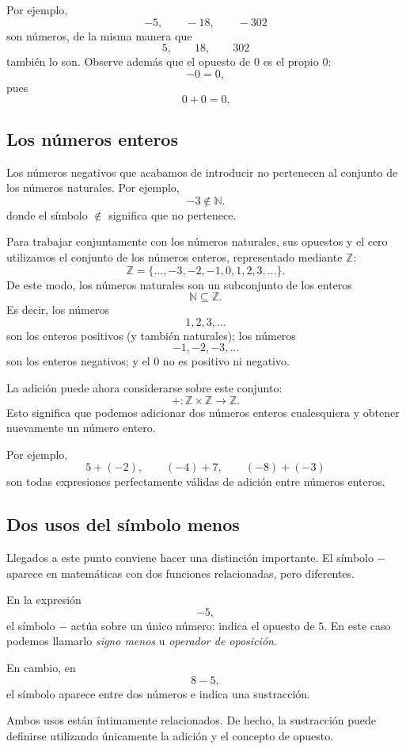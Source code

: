 Por ejemplo,
\[
-5,\qquad -18,\qquad -302
\]
son números, de la misma manera que
\[
5,\qquad18,\qquad302
\]
también lo son.
Observe además que el opuesto de \(0\) es el propio \(0\):
\[
-0=0,
\]
pues
\[
0+0=0.
\]

\subsection{Los números enteros}

Los números negativos que acabamos de introducir no pertenecen al conjunto de los números naturales. Por ejemplo,
\[
-3\notin\mathbb{N}.
\]
donde el símbolo \(\notin\) significa que no pertenece.

Para trabajar conjuntamente con los números naturales, sus opuestos y el cero utilizamos el conjunto de los números enteros, representado mediante \(\mathbb{Z}\):
\[
\mathbb{Z}
=
\{\ldots,-3,-2,-1,0,1,2,3,\ldots\}.
\]
De este modo, los números naturales son un subconjunto de los enteros
\[
\mathbb{N}\subseteq\mathbb{Z}.
\]
Es decir, los números
\[
1,2,3,\ldots
\]
son los enteros positivos (y también naturales); los números
\[
-1,-2,-3,\ldots
\]
son los enteros negativos; y el \(0\) no es positivo ni negativo.

La adición puede ahora considerarse sobre este conjunto:
\[
+\colon\mathbb{Z}\times\mathbb{Z}\to\mathbb{Z}.
\]
Esto significa que podemos adicionar dos números enteros cualesquiera y obtener nuevamente un número entero.

Por ejemplo,
\[
5+(-2),\qquad
(-4)+7,\qquad
(-8)+(-3)
\]
son todas expresiones perfectamente válidas de adición entre números enteros.

\subsection{Dos usos del símbolo menos}

Llegados a este punto conviene hacer una distinción importante. El símbolo \(-\) aparece en matemáticas con dos funciones relacionadas, pero diferentes.

En la expresión
\[
-5,
\]
el símbolo \(-\) actúa sobre un único número: indica el opuesto de \(5\). En este caso podemos llamarlo \emph{signo menos} u \emph{operador de oposición}.

En cambio, en
\[
8-5,
\]
el símbolo aparece entre dos números e indica una sustracción.

Ambos usos están íntimamente relacionados. De hecho, la sustracción puede definirse utilizando únicamente la adición y el concepto de opuesto.

